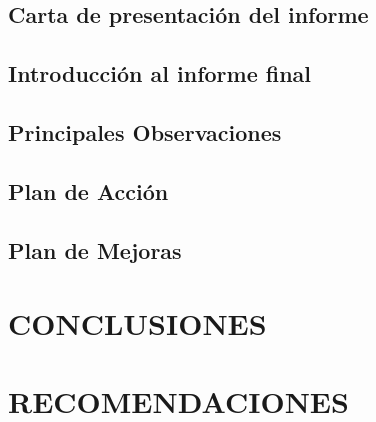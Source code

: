 \documentclass[12pt]{article}
\begin{document}
\subsection{Carta de presentación del informe}
\subsection{Introducción al informe final}
\subsection{Principales Observaciones}
\subsection{Plan de Acción}
\subsection{Plan de Mejoras}

\section{CONCLUSIONES}

\section{RECOMENDACIONES}
\end{document}
